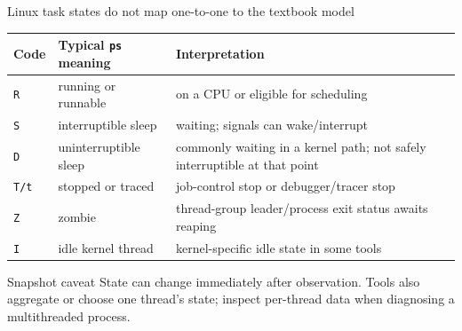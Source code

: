 \documentclass[aspectratio=169,11pt]{beamer}
\newcommand{\code}[1]{\texttt{#1}}
\begin{document}
\begin{frame}{Linux task states do not map one-to-one to the textbook model}
  \small
  \begin{tabularx}{\textwidth}{@{}lXX@{}}
    \toprule
    \textbf{Code} & \textbf{Typical \code{ps} meaning} & \textbf{Interpretation} \\
    \midrule
    \code{R} & running or runnable & on a CPU or eligible for scheduling \\
    \code{S} & interruptible sleep & waiting; signals can wake/interrupt \\
    \code{D} & uninterruptible sleep & commonly waiting in a kernel path; not safely interruptible at that point \\
    \code{T/t} & stopped or traced & job-control stop or debugger/tracer stop \\
    \code{Z} & zombie & thread-group leader/process exit status awaits reaping \\
    \code{I} & idle kernel thread & kernel-specific idle state in some tools \\
    \bottomrule
  \end{tabularx}
  \begin{alertblock}{Snapshot caveat}
    State can change immediately after observation. Tools also aggregate or choose one thread's state; inspect per-thread data when diagnosing a multithreaded process.
  \end{alertblock}
\end{frame}
\end{document}
